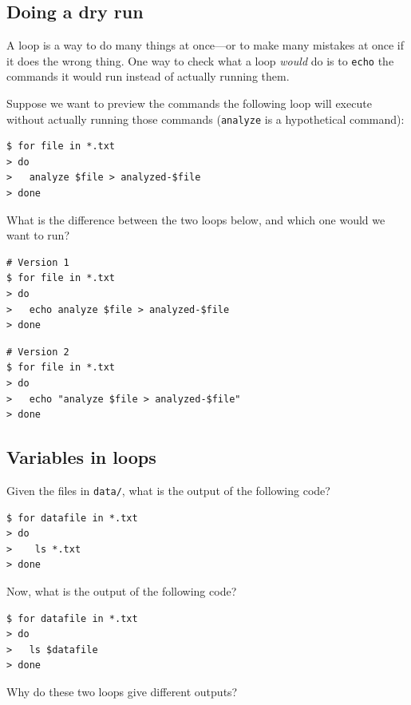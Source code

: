 \documentclass[
]{krantz}
\begin{document}
\hypertarget{bash-tools-ex-loop-dry-run}{%
\subsection{Doing a dry run}\label{bash-tools-ex-loop-dry-run}}

A loop is a way to do many things at once---or to make many mistakes at
once if it does the wrong thing. One way to check what a loop \emph{would} do
is to \texttt{echo} the commands it would run instead of actually running them.

Suppose we want to preview the commands the following loop will execute
without actually running those commands
(\texttt{analyze} is a hypothetical command):

\begin{verbatim}
$ for file in *.txt
> do
>   analyze $file > analyzed-$file
> done
\end{verbatim}

What is the difference between the two loops below, and which one would we
want to run?

\begin{verbatim}
# Version 1
$ for file in *.txt
> do
>   echo analyze $file > analyzed-$file
> done
\end{verbatim}

\begin{verbatim}
# Version 2
$ for file in *.txt
> do
>   echo "analyze $file > analyzed-$file"
> done
\end{verbatim}

\hypertarget{bash-tools-ex-loop-variables}{%
\subsection{Variables in loops}\label{bash-tools-ex-loop-variables}}

Given the files in \texttt{data/},
what is the output of the following code?

\begin{verbatim}
$ for datafile in *.txt
> do
>    ls *.txt
> done
\end{verbatim}

Now, what is the output of the following code?

\begin{verbatim}
$ for datafile in *.txt
> do
>   ls $datafile
> done
\end{verbatim}

Why do these two loops give different outputs?
\end{document}
